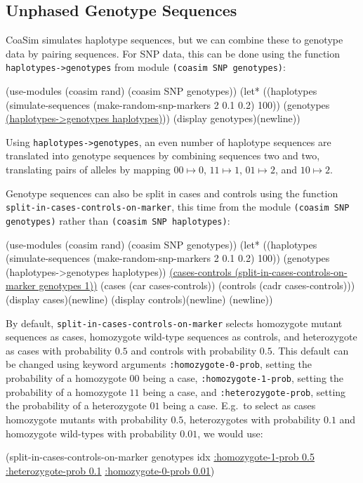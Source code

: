 \documentclass{manual}
\begin{document}
\begin{empfile}
\subsection{Unphased Genotype Sequences}
\label{sec:unph-genotype-sequ}

CoaSim simulates haplotype sequences, but we can combine these to
genotype data by pairing sequences.  For SNP data, this can be done
using the function \texttt{haplotypes->genotypes} from module
\texttt{(coasim SNP genotypes)}:
\begin{code}
(use-modules (coasim rand) (coasim SNP genotypes))
(let* ((haplotypes
          (simulate-sequences (make-random-snp-markers 2 0.1 0.2) 100))
       (genotypes \underline{(haplotypes->genotypes haplotypes)}))
  (display genotypes)(newline))
\end{code}

Using \texttt{haplotypes->genotypes}, an even number of haplotype
sequences are translated into genotype sequences by combining
sequences two and two, translating pairs of alleles by mapping
$00\mapsto 0$, $11\mapsto 1$, $01\mapsto 2$, and $10\mapsto 2$.

Genotype sequences can also be split in cases and controls using the
function \texttt{split-in-cases-controls-on-marker}, this time from the module
\texttt{(coasim SNP genotypes)} rather than \texttt{(coasim SNP haplotypes)}:
\begin{code}
(use-modules (coasim rand) (coasim SNP genotypes))
(let* ((haplotypes
          (simulate-sequences (make-random-snp-markers 2 0.1 0.2) 100))
       (genotypes (haplotypes->genotypes haplotypes))
       \underline{(cases-controls (split-in-cases-controls-on-marker genotypes 1))}
       (cases (car cases-controls))
       (controls (cadr cases-controls)))
  (display cases)(newline)
  (display controls)(newline)
  (newline))
\end{code}

By default, \texttt{split-in-cases-controls-on-marker} selects
homozygote mutant sequences as cases, homozygote wild-type sequences
as controls, and heterozygote as cases with probability $0.5$ and
controls with probability $0.5$.  This default can be changed using
keyword arguments \texttt{:homozygote-0-prob}, setting the probability
of a homozygote $00$ being a case, \texttt{:homozygote-1-prob},
setting the probability of a homozygote $11$ being a case, and
\texttt{:heterozygote-prob}, setting the probability of a heterozygote
$01$ being a case.  E.g.\ to select as cases homozygote mutants with
probability $0.5$, heterozygotes with probability $0.1$ and homozygote
wild-types with probability $0.01$, we would use:
\begin{code}
(split-in-cases-controls-on-marker genotypes idx 
                                   \underline{:homozygote-1-prob 0.5}
                                   \underline{:heterozygote-prob 0.1}
                                   \underline{:homozygote-0-prob 0.01})
\end{code}


\end{empfile}
\end{document}
